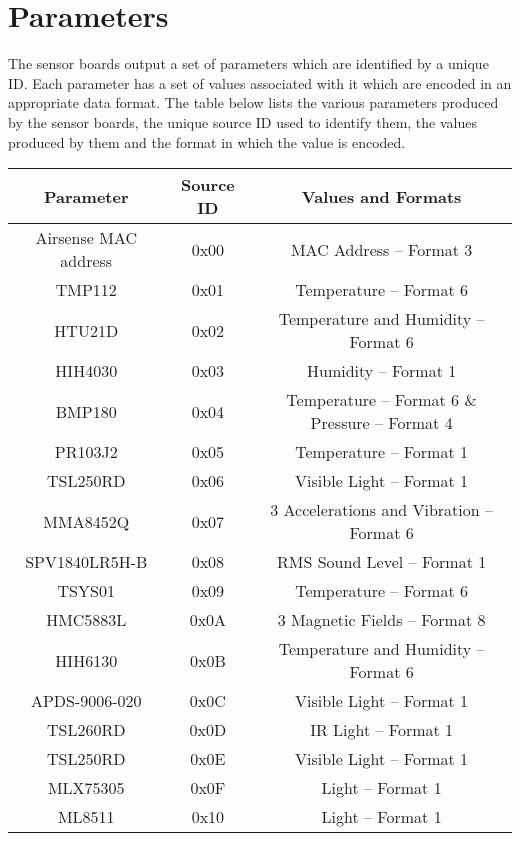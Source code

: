 \newpage
\section{Parameters}

The sensor boards output a set of parameters which are identified by a unique ID. Each parameter
has a set of values associated with it which are encoded in an appropriate data format. The table
below lists the various parameters produced by the sensor boards, the unique source
ID used to identify them, the values produced by them and the format in which the value
is encoded.

\begin{table}[H]
    \centering
    {
    \begin{tabular}{|c|c|c|}
        \hline
        \textbf{Parameter} & \textbf{Source ID} & \textbf{Values and Formats}\\
        \hline
        \hline
        Airsense MAC address & 0x00 & MAC Address -- Format 3 \\
        TMP112 & 0x01 & Temperature -- Format 6\\
        HTU21D & 0x02 & Temperature and Humidity -- Format 6\\
        HIH4030 & 0x03 & Humidity -- Format 1 \\
        BMP180 & 0x04 & Temperature -- Format 6 \& Pressure -- Format 4\\
        PR103J2 & 0x05 & Temperature -- Format 1\\
        TSL250RD & 0x06 & Visible Light -- Format 1\\
        MMA8452Q & 0x07 & 3 Accelerations and Vibration -- Format 6\\
        SPV1840LR5H-B & 0x08 & RMS Sound Level -- Format 1\\
        TSYS01 & 0x09 & Temperature -- Format 6\\
        HMC5883L & 0x0A & 3 Magnetic Fields -- Format 8\\
        HIH6130 & 0x0B & Temperature and Humidity -- Format 6\\
        APDS-9006-020 & 0x0C & Visible Light -- Format 1\\
        TSL260RD & 0x0D & IR Light -- Format 1\\
        TSL250RD & 0x0E & Visible Light -- Format 1\\
        MLX75305 & 0x0F & Light -- Format 1\\
        ML8511 & 0x10 & Light -- Format 1\\

\end{tabular}}
\end{table}
